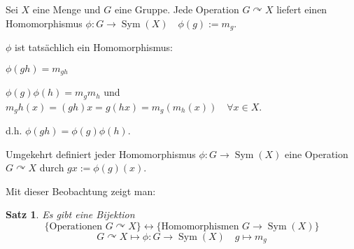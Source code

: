 \documentclass{article}
\theoremstyle{plain}
\newtheorem{theorem}{Satz}
\newcommand{\defeq}{:=}
\newcommand{\sym}{\mathop{\text{Sym}}}
\newcommand{\operateson}{\curvearrowright}
\begin{document}
Sei $X$ eine Menge und $G$ eine Gruppe. Jede Operation $G\operateson X$ liefert einen Homomorphismus $\phi\colon G\to \sym(X)\quad \phi(g)\defeq m_g$.

$\phi$ ist tatsächlich ein Homomorphismus:

$\phi(gh)=m_{gh}$

$\phi(g)\phi(h)=m_gm_h$ und $m_gh(x)=(gh)x=g(hx)=m_g(m_h(x)) \quad \forall x\in X$.

d.h. $\phi(gh)=\phi(g)\phi(h)$.

Umgekehrt definiert jeder Homomorphismus $\phi\colon G\to\sym(X)$ eine Operation $G\operateson X$ durch $gx\defeq \phi(g)(x)$.

Mit dieser Beobachtung zeigt man:
\begin{theorem}
    Es gibt eine Bijektion
    $$\{\text{Operationen } G\operateson X\} \leftrightarrow\{\text{Homomorphismen } G\to \sym(X)\}$$
    $$G\operateson X \mapsto \phi\colon G\to \sym(X) \quad g\mapsto m_g$$
\end{theorem}
\end{document}
